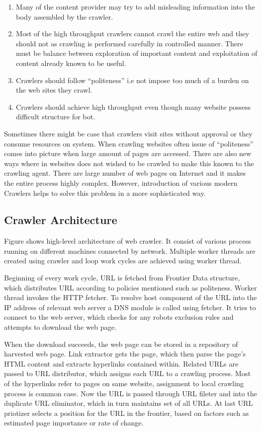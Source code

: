 \documentclass[12pt]{report}
\begin{document}
\begin{enumerate} [label=(\alph*)]
\item Many of the content provider may try to add misleading information into the body assembled by the crawler.
\item Most of the high throughput crawlers cannot crawl the entire web and they should not as crawling is performed carefully in controlled manner. There must be balance between exploration of important content and exploitation of content already known to be useful.
\item Crawlers should follow “politeness” i.e not impose too much of a burden on the web sites they crawl.
\item Crawlers should achieve high throughput even though many website possess difficult structure for bot.
\end{enumerate}
Sometimes there might be case that crawlers visit sites without approval or they consume resources on system. When crawling websites often issue of “politeness” comes into picture when large amount of pages are accessed. There are also new ways where in websites does not wished to be crawled to make this known to the crawling agent. There are large number of web pages on Internet and it makes the entire process highly complex. However, introduction of various modern Crawlers helps to solve this problem in a more sophisticated way.
\subsection*{Crawler Architecture}

Figure shows high-level architecture of web crawler. It consist of various process running on different machines connected by network. Multiple worker threads are created using crawler and loop work cycles are achieved using worker thread.

	Beginning of every work cycle, URL is fetched from Frontier Data structure,  which distributes URL according to policies mentioned such as politeness. Worker thread invokes the HTTP fetcher. To resolve host component of the URL into the IP address of relevant web server a DNS module is called using fetcher. It tries to connect to the web server, which checks for any robots exclusion rules and attempts to download the web page.
	
 When the download succeeds, the web page can be stored in a repository of harvested web page. Link extractor gets the page, which then parse the page’s HTML content and extracts hyperlinks contained within. Related URLs are passed to URL distributor, which assigns each URL to a crawling process. Most of the hyperlinks refer to pages on same website, assignment to local crawling process is common case. Now the URL is passed through URL fileter and into the duplicate URL eliminator, which in turn maintains set of all URLs.  At last URL priotizer selects a position for the URL in the frontier, based on factors such as estimated page importance or rate of change.
 
\end{document}

